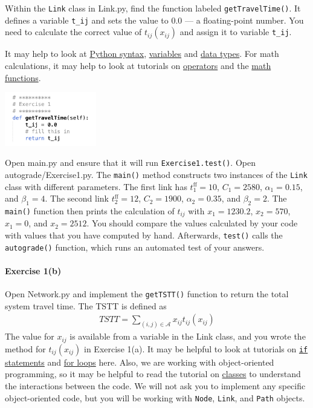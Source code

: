 \documentclass[11pt]{article}
\newcommand{\A}{\mathcal{A}}
\begin{document}
Within the \texttt{Link} class in Link.py, find the function labeled \texttt{getTravelTime()}. It defines a variable \texttt{t\_{ij}} and sets the value to 0.0 --- a floating-point number. You need to calculate the correct value of $t_{ij}(x_{ij})$ and assign it to variable \texttt{t\_ij}. 


It may help to look at  \href{https://www.w3schools.com/python/python_syntax.asp}{Python syntax},  \href{https://www.w3schools.com/python/python_variables.asp}{variables} and \href{https://www.w3schools.com/python/python_datatypes.asp}{data types}. For math calculations, it may help to look at tutorials on \href{https://www.w3schools.com/python/python_operators.asp}{operators} and the \href{https://www.w3schools.com/python/python_math.asp}{math functions}. 

\begin{center}
	\includegraphics[width=0.3\textwidth]{netbeans3.png}
\end{center}

\noindent Open main.py and ensure that it will run \texttt{Exercise1.test()}.
Open autograde/Exercise1.py. The \texttt{main()} method constructs two instances of the \texttt{Link} class with different parameters. The first link has $t^{\mathrm{ff}}_{1}=10$, $C_{1}=2580$, $\alpha_{1}=0.15$, and $\beta_{1}=4$. The second link $t^{\mathrm{ff}}_{2}=12$, $C_{2}=1900$, $\alpha_{2}=0.35$, and $\beta_{2}=2$. The \texttt{main()} function then prints the calculation of $t_{ij}$ with $x_{1}=1230.2$, $x_2=570$, $x_1=0$, and $x_2=2512$. You should compare the values calculated by your code with values that you have computed by hand. 
Afterwards, \texttt{test()} calls the \texttt{autograde()} function, which runs an automated test of your answers. 


	
	
\paragraph*{Exercise 1(b)}  Open Network.py and implement the \texttt{getTSTT()} function to  return the total system travel time. The TSTT is defined as
\begin{align}
	TSTT = \sum_{(i,j)\in\A} x_{ij} t_{ij}(x_{ij})
\end{align}
The value for $x_{ij}$ is available from a variable in the Link class, and you wrote the method for $t_{ij}(x_{ij})$ in Exercise 1(a).
%
It may be helpful to look at tutorials on \href{https://www.w3schools.com/python/python_conditions.asp}{\texttt{if} statements}
 and \href{https://www.w3schools.com/python/python_for_loops.asp}{for loops} here.  Also, we are working with object-oriented programming, so it may be helpful to read the tutorial on \href{https://www.w3schools.com/python/python_classes.asp}{classes} to understand the interactions between the code. We will not ask you to implement any specific object-oriented code, but you will be working with \texttt{Node}, \texttt{Link}, and \texttt{Path} objects.
\end{document}
